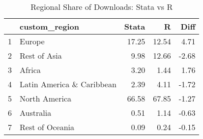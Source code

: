 \begin{table}[ht]
\centering
\begin{tabular}{rlrrr}
  \hline
 & custom\_region & Stata & R & Diff \\ 
  \hline
1 & Europe & 17.25 & 12.54 & 4.71 \\ 
  2 & Rest of Asia & 9.98 & 12.66 & -2.68 \\ 
  3 & Africa & 3.20 & 1.44 & 1.76 \\ 
  4 & Latin America \& Caribbean & 2.39 & 4.11 & -1.72 \\ 
  5 & North America & 66.58 & 67.85 & -1.27 \\ 
  6 & Australia & 0.51 & 1.14 & -0.63 \\ 
  7 & Rest of Oceania & 0.09 & 0.24 & -0.15 \\ 
   \hline
\end{tabular}
\caption{Regional Share of Downloads: Stata vs R} 
\label{tab:region_compare}
\end{table}
